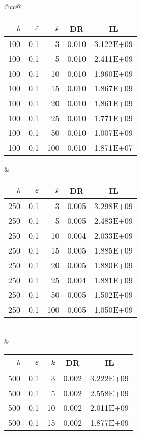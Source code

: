 \begin{table}[H]
	\centering
	\begin{tabular}{@{}cc@{}}
		\begin{tabular}{@{}rrrrr@{}}
			\toprule
			$b$ & $\varepsilon$ & $k$ & \multicolumn{1}{c}{DR} & \multicolumn{1}{c}{IL} \\ \midrule
			100 & 0.1 & 3   & 0.010 & 3.122E+09 \\
			100 & 0.1 & 5   & 0.010 & 2.411E+09 \\
			100 & 0.1 & 10  & 0.010 & 1.960E+09 \\
			100 & 0.1 & 15  & 0.010 & 1.867E+09 \\
			100 & 0.1 & 20  & 0.010 & 1.861E+09 \\
			100 & 0.1 & 25  & 0.010 & 1.771E+09 \\
			100 & 0.1 & 50  & 0.010 & 1.007E+09 \\
			100 & 0.1 & 100 & 0.010 & 1.871E+07 \\ \bottomrule
		\end{tabular}
		&
		\begin{tabular}{@{}rrrrr@{}}
			\toprule
			$b$ & $\varepsilon$ & $k$ & \multicolumn{1}{c}{DR} & \multicolumn{1}{c}{IL} \\ \midrule
			250 & 0.1 & 3   & 0.005 & 3.298E+09 \\
			250 & 0.1 & 5   & 0.005 & 2.483E+09 \\
			250 & 0.1 & 10  & 0.004 & 2.033E+09 \\
			250 & 0.1 & 15  & 0.005 & 1.885E+09 \\
			250 & 0.1 & 20  & 0.005 & 1.880E+09 \\
			250 & 0.1 & 25  & 0.004 & 1.881E+09 \\
			250 & 0.1 & 50  & 0.005 & 1.502E+09 \\
			250 & 0.1 & 100 & 0.005 & 1.050E+09 \\ \bottomrule
		\end{tabular}
		\\ & \\
		\begin{tabular}{@{}rrrrr@{}}
			\toprule
			$b$ & $\varepsilon$ & $k$ & \multicolumn{1}{c}{DR} & \multicolumn{1}{c}{IL} \\ \midrule
			500 & 0.1 & 3   & 0.002 & 3.222E+09 \\
			500 & 0.1 & 5   & 0.002 & 2.558E+09 \\
			500 & 0.1 & 10  & 0.002 & 2.011E+09 \\
			500 & 0.1 & 15  & 0.002 & 1.877E+09 \\

\end{tabular}
\end{tabular}
\end{table}
